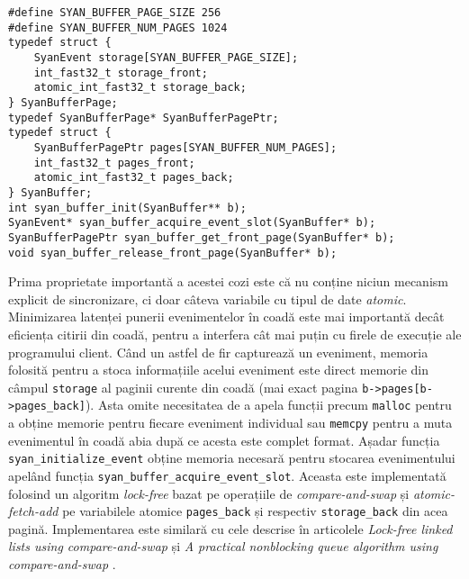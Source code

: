\begin{lstlisting}[caption=Interfața cozii de evenimente folosite în
                           bibliotecă,
                   label=code:queue-interface, float, floatplacement=H]
#define SYAN_BUFFER_PAGE_SIZE 256
#define SYAN_BUFFER_NUM_PAGES 1024
typedef struct {
    SyanEvent storage[SYAN_BUFFER_PAGE_SIZE];
    int_fast32_t storage_front;
    atomic_int_fast32_t storage_back;
} SyanBufferPage;
typedef SyanBufferPage* SyanBufferPagePtr;
typedef struct {
    SyanBufferPagePtr pages[SYAN_BUFFER_NUM_PAGES];
    int_fast32_t pages_front;
    atomic_int_fast32_t pages_back;
} SyanBuffer;
int syan_buffer_init(SyanBuffer** b);
SyanEvent* syan_buffer_acquire_event_slot(SyanBuffer* b);
SyanBufferPagePtr syan_buffer_get_front_page(SyanBuffer* b);
void syan_buffer_release_front_page(SyanBuffer* b);
\end{lstlisting}
Prima proprietate importantă a acestei cozi este că nu conține niciun
mecanism explicit de sincronizare, ci doar câteva variabile cu tipul de
date \textit{atomic}. Minimizarea latenței punerii evenimentelor în
coadă este mai importantă decât eficiența citirii din coadă, pentru a
interfera cât mai puțin cu firele de execuție ale programului client.
Când un astfel de fir capturează un eveniment, memoria folosită pentru
a stoca informațiile acelui eveniment este direct memorie din câmpul
\lstinline{storage} al paginii curente din coadă (mai exact pagina
\lstinline{b->pages[b->pages_back]}). Asta omite necesitatea de a apela
funcții precum \lstinline{malloc} pentru a obține memorie pentru fiecare
eveniment individual sau \lstinline{memcpy} pentru a muta evenimentul
în coadă abia după ce acesta este complet format. Așadar funcția
\lstinline{syan_initialize_event} obține memoria necesară pentru
stocarea evenimentului apelând funcția
\lstinline{syan_buffer_acquire_event_slot}. Aceasta este implementată
folosind un algoritm \textit{lock-free} bazat pe operațiile de
\textit{compare-and-swap} și \textit{atomic-fetch-add} pe variabilele
atomice \lstinline{pages_back} și respectiv \lstinline{storage_back} din
acea pagină. Implementarea este similară cu cele descrise în articolele
\textit{Lock-free linked lists using compare-and-swap}
\cite{LinkedListsCAS} și
\textit{A practical nonblocking queue algorithm using compare-and-swap}
\cite{QueueCAS}.

